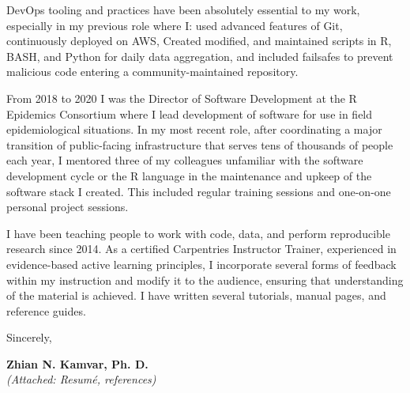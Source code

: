 \vspace{2ex}

DevOps tooling and practices have been absolutely essential to my work,
especially in my previous role where I: used advanced features of Git,
continuously deployed on AWS, Created modified, and maintained scripts in R,
BASH, and Python for daily data aggregation, and included failsafes to prevent
malicious code entering a community-maintained repository. 


\vspace{2ex}

From 2018 to 2020 I was the Director of Software Development at the R Epidemics Consortium where I lead development of software for use in field epidemiological situations. In my most recent role, after coordinating a major transition of public-facing infrastructure that serves tens of thousands of people each year, I mentored
three of my colleagues unfamiliar with the software development cycle or the R language in the maintenance and upkeep of the software stack I created. This included regular training sessions and one-on-one personal project sessions. 

\vspace{2ex}

I have been teaching people to work with code, data, and perform
reproducible research since 2014. As a certified Carpentries Instructor
Trainer, experienced in evidence-based active learning principles, I incorporate several forms of feedback within my instruction and modify it to the audience, ensuring that understanding of the material is achieved. I have written several tutorials, manual pages, and reference guides.

\vspace{3ex}

Sincerely,

\vspace{4ex}

\textbf{Zhian N. Kamvar, Ph. D.}\\
{\footnotesize \textit{(Attached: Resum\'{e}, references)}}

\clearpage



